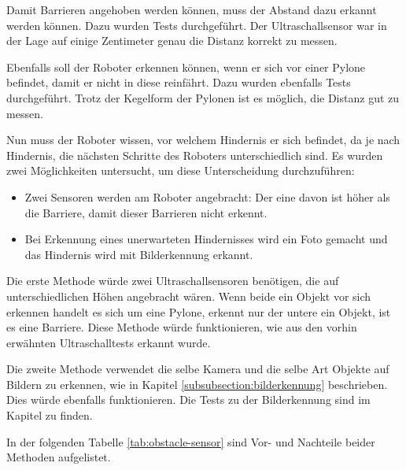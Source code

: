 Damit Barrieren angehoben werden können, muss der Abstand dazu erkannt werden können. Dazu wurden Tests durchgeführt. Der Ultraschallsensor war in der Lage auf einige Zentimeter genau die Distanz korrekt zu messen.

Ebenfalls soll der Roboter erkennen können, wenn er sich vor einer Pylone befindet, damit er nicht in diese reinfährt. Dazu wurden ebenfalls Tests durchgeführt. Trotz der Kegelform der Pylonen ist es möglich, die Distanz gut zu messen.

Nun muss der Roboter wissen, vor welchem Hindernis er sich befindet, da je nach Hindernis, die nächsten Schritte des Roboters unterschiedlich sind. Es wurden zwei Möglichkeiten untersucht, um diese Unterscheidung durchzuführen:

\begin{itemize}
    \item Zwei Sensoren werden am Roboter angebracht: Der eine davon ist höher als die Barriere, damit dieser Barrieren nicht erkennt.
    \item Bei Erkennung eines unerwarteten Hindernisses wird ein Foto gemacht und das Hindernis wird mit Bilderkennung erkannt.
\end{itemize}

Die erste Methode würde zwei Ultraschallsensoren benötigen, die auf unterschiedlichen Höhen angebracht wären. Wenn beide ein Objekt vor sich erkennen handelt es sich um eine Pylone, erkennt nur der untere ein Objekt, ist es eine Barriere. Diese Methode würde funktionieren, wie aus den vorhin erwähnten Ultraschalltests erkannt wurde.

Die zweite Methode verwendet die selbe Kamera und die selbe Art Objekte auf Bildern zu erkennen, wie in Kapitel \ref{subsubsection:bilderkennung} beschrieben. Dies würde ebenfalls funktionieren. Die Tests zu der Bilderkennung sind im Kapitel  zu finden.

In der folgenden Tabelle \ref{tab:obstacle-sensor} sind Vor- und Nachteile beider Methoden aufgelistet.



